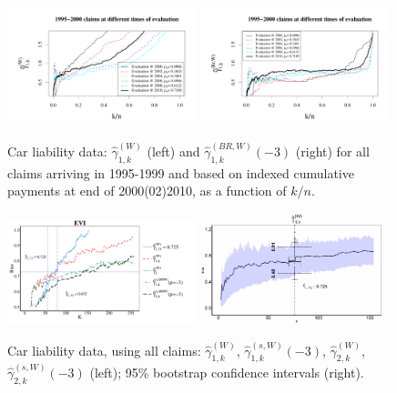 	\begin{figure}[h]
		\centering
		\includegraphics[width=0.49\textwidth]{./plots/paper2/EWorms_sliced.pdf}
	\includegraphics[width=0.49\textwidth]{./plots/paper2/EWormsBR_sliced.pdf}
		\caption{Car liability data: $\hat{\gamma}_{1,k}^{(W)}$ (left) and $\hat{\gamma}_{1,k}^{(BR,W)}(-3)$ (right) for all claims arriving in 1995-1999 and based on indexed cumulative payments at end of 2000(02)2010, as a function of $k/n$. }
	\label{paper2:fig9}
	\end{figure}
	
	\begin{figure}[h]
		\centering
			\includegraphics[width=0.49\textwidth]{./plots/paper2/k1k2WEVI12.pdf}
			\includegraphics[width=0.49\textwidth]{./plots/paper2/sWEVI73_50.pdf}
		\caption{Car liability data, using all claims: $\hat{\gamma}_{1,k}^{(W)}$, $\hat{\gamma}_{1,k}^{(s,W)}(-3)$, $\hat{\gamma}_{2,k}^{(W)}$, $\hat{\gamma}_{2,k}^{(s,W)}(-3)$ (left); 95\% bootstrap confidence intervals (right).}
	\label{paper2:fig10}
	\end{figure}